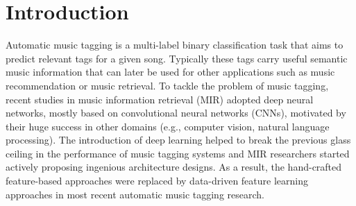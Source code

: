 \documentclass{article}
\title{\papertitle}
\begin{document}
\capstartfalse
\maketitle
\capstarttrue

\begin{abstract}
Recent advances in deep learning accelerated the development of content-based automatic music tagging systems. Music information retrieval (MIR) researchers proposed various architecture designs, mainly based on convolutional neural networks (CNNs), that achieve state-of-the-art results in this multi-label binary classification task. However, due to the differences in experimental setups followed by researchers, such as using different dataset splits and software versions for evaluation, it is difficult to compare the proposed architectures directly with each other. To facilitate further research, in this paper we conduct a consistent evaluation of different music tagging models on three datasets (MagnaTagATune, Million Song Dataset, and MTG-Jamendo) and provide reference results using common evaluation metrics (ROC-AUC and PR-AUC). Furthermore, all the models are evaluated with perturbed inputs to investigate the generalization capabilities concerning time stretch, pitch shift, dynamic range compression, and addition of white noise. For reproducibility, we provide the PyTorch implementations with the pre-trained models.



\end{abstract}









\section{Introduction}\label{sec:introduction}
Automatic music tagging is a multi-label binary classification task that aims to predict relevant tags for a given song. 
Typically these tags carry useful semantic music information that can later be used for other applications such as music recommendation or music retrieval. 
To tackle the problem of music tagging, recent studies in music information retrieval (MIR) adopted deep neural networks, mostly based on convolutional neural networks (CNNs), motivated by their huge success in other domains (e.g., computer vision, natural language processing). The introduction of deep learning helped to break the previous glass ceiling in the performance of music tagging systems and MIR researchers started actively proposing ingenious architecture designs. As a result, the hand-crafted feature-based approaches were replaced by data-driven feature learning approaches in most recent automatic music tagging research. 
\end{document}
